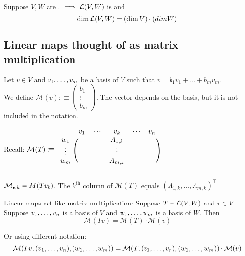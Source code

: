 \begin{thm}
    Suppose $V,W$ are \fd. $\implies {\mathcal{L}(V,W)}$ is \fd and
    \begin{equation}
    	\dim {\mathcal{L}(V,W)} = (\dim V)\cdot(dim W)
    \end{equation}
\end{thm}

\subsection{Linear maps thought of as matrix multiplication}

\begin{mydef}
    Let $v \in V$ and $v_1, \dots, v_m$ be a basis of $V$ such that $v=b_1v_1+\dots+b_mv_m$.
    \\
    We define
    $
    	\mathcal{M}(v) :\equiv
    	\left (
    	\begin{matrix}
    		b_1 \\ \vdots \\ b_m
    	\end{matrix}
    	\right )
    $. The vector depends on the basis, but it is not included in the notation.
\end{mydef}

Recall: $
 \mathcal{M} (T) :\equiv
\begin{blockarray}{cccc}
	& v_1 \quad \cdots & v_k & \cdots \quad v_n \\
	\begin{block}{c(ccc)}
		w_1    & & A_{1,k} & \\
		\vdots & & \vdots & \\
		w_m    & & A_{m,k} & \\
	\end{block}
\end{blockarray}
$


\setcounter{thm}{74}
\begin{thm}
    $\mathcal{M}_{\mathsmaller{\bullet}, k} = M(T v_k)$. The $k^{\text{th}}$ column of $\mathcal{M}(T)$ equals $(A_{1,k}, \dots, A_{m,k})^\top$
\end{thm}

\begin{thm}
    Linear maps act like matrix multiplication: Suppose $T\in {\mathcal{L}(V,W)}$ and $v\in V$. Suppose $v_1, \dots, v_n$ is a basis of $V$ and $w_1, \dots, w_m$ is a basis of $W$. Then
    \begin{equation}
    	\mathcal{M} (Tv)=\mathcal{M}(T) \cdot \mathcal{M}(v)
    \end{equation}

    Or using different notation:
    \begin{equation}
\mathcal{M} (Tv, (v_1, \dots, v_n), (w_1, \dots, w_m))=\mathcal{M}(T, (v_1, \dots, v_n), (w_1, \dots, w_m)) \cdot \mathcal{M}(v)
    \end{equation}

\end{thm}

